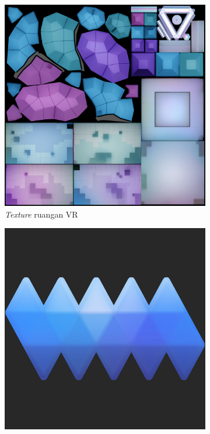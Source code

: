 
\begin{figure}[]
	\begin{subfigure}{.33\textwidth}
  		\centering
  		\includegraphics[width=.8\linewidth]{Gambar/room.png}
  		\caption{\textit{Texture} ruangan VR \\}
  		\label{fig:vr-room}
	\end{subfigure}
	\begin{subfigure}{.33\textwidth}
  		\centering
  		\includegraphics[width=.8\linewidth]{Gambar/shape_blue.png}

\end{subfigure}
\end{figure}
